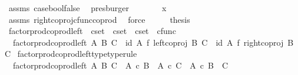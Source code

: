 \begin{isabellebody}
\ assms\ case{\isacharunderscore}{\kern0pt}bool{\isacharunderscore}{\kern0pt}false\ \isamarkupfalse%
\ presburger\isanewline
\ \ \isamarkupfalse%
\ \isamarkupfalse%
\ {\isachardoublequoteopen}{\isachardot}{\kern0pt}{\isachardot}{\kern0pt}{\isachardot}{\kern0pt}\ {\isacharequal}{\kern0pt}\ x{}{\isachardoublequoteclose}\isanewline
\ \ \ \ \isamarkupfalse%
\ assms\ right{\isacharunderscore}{\kern0pt}coproj{\isacharunderscore}{\kern0pt}cfunc{\isacharunderscore}{\kern0pt}coprod\ \isamarkupfalse%
\ force\isanewline
\ \ \isamarkupfalse%
\ \isamarkupfalse%
\ {\isacharquery}{\kern0pt}thesis\isacommand{{\isachardot}{\kern0pt}}\isamarkupfalse%
\isanewline
{}\isamarkupfalse%
%
\endisatagproof
{\isafoldproof}%
%
\isadelimproof
%
\endisadelimproof
%
\isadelimdocument
%
\endisadelimdocument
%
\isatagdocument
%
\isamarkuptrue%
%
\isamarkuptrue%
%
\endisatagdocument
{\isafolddocument}%
%
\isadelimdocument
%
\endisadelimdocument
{}\isamarkupfalse%
\ factor{\isacharunderscore}{\kern0pt}prod{\isacharunderscore}{\kern0pt}coprod{\isacharunderscore}{\kern0pt}left\ {\isacharcolon}{\kern0pt}{\isacharcolon}{\kern0pt}\ {\isachardoublequoteopen}cset\ {\isasymRightarrow}\ cset\ {\isasymRightarrow}\ cset\ {\isasymRightarrow}\ cfunc{\isachardoublequoteclose}\ \isanewline
\ \ {\isachardoublequoteopen}factor{\isacharunderscore}{\kern0pt}prod{\isacharunderscore}{\kern0pt}coprod{\isacharunderscore}{\kern0pt}left\ A\ B\ C\ {\isacharequal}{\kern0pt}\ {\isacharparenleft}{\kern0pt}id\ A\ {\isasymtimes}\isactrlsub f\ left{\isacharunderscore}{\kern0pt}coproj\ B\ C{\isacharparenright}{\kern0pt}\ {\isasymamalg}\ {\isacharparenleft}{\kern0pt}id\ A\ {\isasymtimes}\isactrlsub f\ right{\isacharunderscore}{\kern0pt}coproj\ B\ C{\isacharparenright}{\kern0pt}{\isachardoublequoteclose}\isanewline
\isanewline
{}\isamarkupfalse%
\ factor{\isacharunderscore}{\kern0pt}prod{\isacharunderscore}{\kern0pt}coprod{\isacharunderscore}{\kern0pt}left{\isacharunderscore}{\kern0pt}type{\isacharbrackleft}{\kern0pt}type{\isacharunderscore}{\kern0pt}rule{\isacharbrackright}{\kern0pt}{\isacharcolon}{\kern0pt}\isanewline
\ \ {\isachardoublequoteopen}factor{\isacharunderscore}{\kern0pt}prod{\isacharunderscore}{\kern0pt}coprod{\isacharunderscore}{\kern0pt}left\ A\ B\ C\ {\isacharcolon}{\kern0pt}\ {\isacharparenleft}{\kern0pt}A\ {\isasymtimes}\isactrlsub c\ B{\isacharparenright}{\kern0pt}\ {\isasymCoprod}\ {\isacharparenleft}{\kern0pt}A\ {\isasymtimes}\isactrlsub c\ C{\isacharparenright}{\kern0pt}\ {\isasymrightarrow}\ A\ {\isasymtimes}\isactrlsub c\ {\isacharparenleft}{\kern0pt}B\ {\isasymCoprod}\ C{\isacharparenright}{\kern0pt}{\isachardoublequoteclose}\isanewline

\end{isabellebody}
